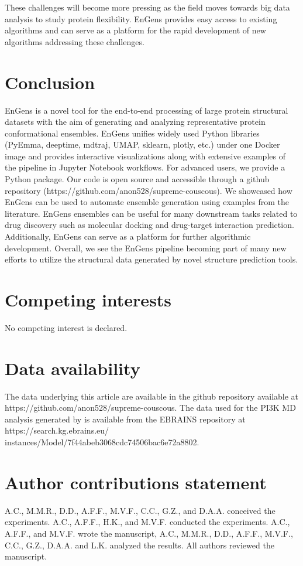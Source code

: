 \documentclass[numsec,webpdf,contemporary,large]{oup-authoring-template}
\theoremstyle{thmstyleone}%
\theoremstyle{thmstyletwo}%
\theoremstyle{thmstylethree}%
\begin{document}
These challenges will become more pressing as the field moves towards big data analysis to study protein flexibility. EnGens provides easy access to existing algorithms and can serve as a platform for the rapid development of new algorithms addressing these challenges.

\section{Conclusion}

EnGens is a novel tool for the end-to-end processing of large protein structural datasets with the aim of generating and analyzing representative protein conformational ensembles. EnGens unifies widely used Python libraries (PyEmma, deeptime, mdtraj, UMAP, sklearn, plotly, etc.) under one Docker image and provides interactive visualizations along with extensive examples of the pipeline in Jupyter Notebook workflows. For advanced users, we provide a Python package. Our code is open source and accessible through a github repository (https://github.com/anon528/supreme-couscous). We showcased how EnGens can be used to automate ensemble generation using examples from the literature.  EnGens ensembles can be useful for many downstream tasks related to drug discovery such as molecular docking and drug-target interaction prediction. Additionally, EnGens can serve as a platform for further algorithmic development. Overall, we see the EnGens pipeline becoming part of many new efforts to utilize the structural data generated by novel structure prediction tools. 


\section{Competing interests}
No competing interest is declared.

\section{Data availability}
The data underlying this article are available in the github repository available at https://github.com/anon528/supreme-couscous. 
The data used for the PI3K MD analysis generated by \cite{galdadas_unravelling_2020} is available from the EBRAINS repository at https://search.kg.ebrains.eu/
instances/Model/7f44abeb3068cdc74506bac6e72a8802.

\section{Author contributions statement}
A.C., M.M.R., D.D., A.F.F., M.V.F., C.C., G.Z., and D.A.A. conceived the experiments. A.C., A.F.F., H.K., and M.V.F. conducted the experiments. A.C., A.F.F., and M.V.F. wrote the manuscript, A.C., M.M.R., D.D., A.F.F., M.V.F., C.C., G.Z., D.A.A. and L.K. analyzed the results. All authors reviewed the manuscript.
\end{document}
